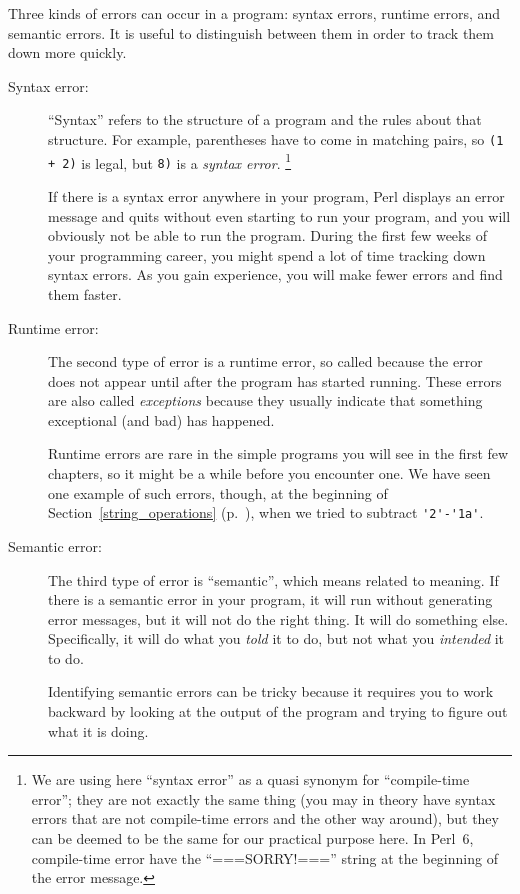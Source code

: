 Three kinds of errors can occur in a program: syntax errors, runtime 
errors, and semantic errors.  It is useful
to distinguish between them in order to track them down more quickly.

\begin{description}

\item[Syntax error:] ``Syntax'' refers to the structure of a program
  and the rules about that structure.  For example, parentheses have
  to come in matching pairs, so {\tt (1 + 2)} is legal, but 
{\tt 8)} is a \emph{syntax error}. \footnote{We are using here 
``syntax error'' as a quasi synonym for ``compile-time error''; 
they are not exactly the same thing (you may in theory have 
syntax errors that are not compile-time errors and the other way 
around), but they can be deemed to be the same for our 
practical purpose here. In Perl~6, compile-time error 
have the ``===SORRY!==='' string at the beginning of 
the error message.}


If there is a syntax error
anywhere in your program, Perl displays an error message and quits 
without even starting to run your program, and you will 
obviously not be able to run the program.  During the first few
weeks of your programming career, you might spend a lot of
time tracking down syntax errors.  As you gain experience, you will
make fewer errors and find them faster.


\item[Runtime error:] The second type of error is a runtime error, so
  called because the error does not appear until after the program has
  started running.  These errors are also called \emph{exceptions}
  because they usually indicate that something exceptional (and bad)
  has happened.   
    

Runtime errors are rare in the simple programs you will see in the
first few chapters, so it might be a while before you encounter one. 
We have seen one example of such errors, though, at the beginning 
of Section~\ref{string_operations} (p.~\pageref{string_operations}), 
when we tried to subtract \verb"'2'-'1a'". 


\item[Semantic error:] The third type of error is ``semantic'', which
  means related to meaning.  If there is a semantic error in your
  program, it will run without generating error messages, but it will
  not do the right thing.  It will do something else.  Specifically,
  it will do what you \emph{told} it to do, but not what you 
  \emph{intended} it to do.
   

Identifying semantic errors can be tricky because it requires you to work
backward by looking at the output of the program and trying to figure
out what it is doing.

\end{description}


